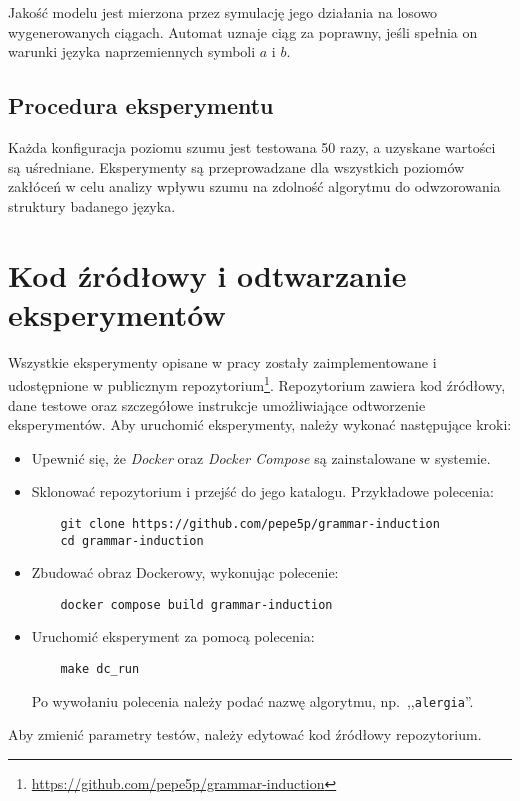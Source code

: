 Jakość modelu jest mierzona przez symulację jego działania na losowo wygenerowanych ciągach. Automat uznaje ciąg za poprawny, jeśli spełnia on warunki języka naprzemiennych symboli \( a \) i \( b \).  

\subsection{Procedura eksperymentu}  
Każda konfiguracja poziomu szumu jest testowana 50 razy, a uzyskane wartości są uśredniane. Eksperymenty są przeprowadzane dla wszystkich poziomów zakłóceń w celu analizy wpływu szumu na zdolność algorytmu do odwzorowania struktury badanego języka.  


\section{Kod źródłowy i odtwarzanie eksperymentów}  
\label{sec:code}  

Wszystkie eksperymenty opisane w pracy zostały zaimplementowane i udostępnione w publicznym repozytorium\footnote{\url{https://github.com/pepe5p/grammar-induction}}. Repozytorium zawiera kod źródłowy, dane testowe oraz szczegółowe instrukcje umożliwiające odtworzenie eksperymentów. Aby uruchomić eksperymenty, należy wykonać następujące kroki:  
\begin{itemize}  
    \item Upewnić się, że \textit{Docker} oraz \textit{Docker Compose} są zainstalowane w systemie.  
    \item Sklonować repozytorium i przejść do jego katalogu. Przykładowe polecenia:  
    \begin{verbatim}
    git clone https://github.com/pepe5p/grammar-induction
    cd grammar-induction
    \end{verbatim} 
    \item Zbudować obraz Dockerowy, wykonując polecenie:  
    \begin{verbatim}
    docker compose build grammar-induction
    \end{verbatim}  
    \item Uruchomić eksperyment za pomocą polecenia:  
    \begin{verbatim}
    make dc_run
    \end{verbatim}
    Po wywołaniu polecenia należy podać nazwę algorytmu, np.\ ,,\texttt{alergia}''.
\end{itemize} 

Aby zmienić parametry testów, należy edytować kod źródłowy repozytorium.

